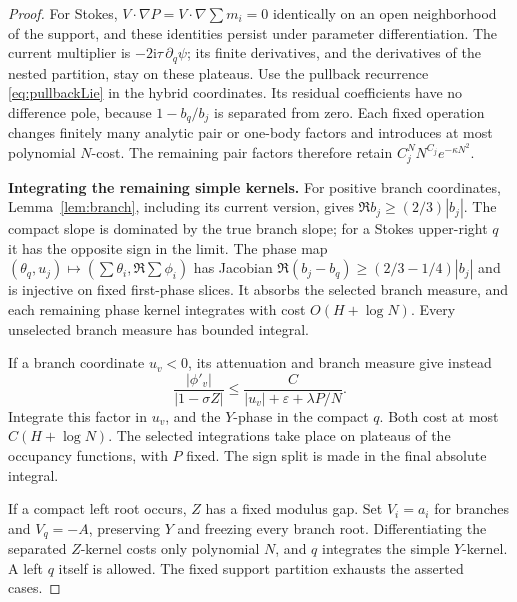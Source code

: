 \documentclass[11pt]{article}
\numberwithin{equation}{section}
\theoremstyle{definition}
\newcommand{\ii}{\mathrm i}
\newcommand{\eps}{\varepsilon}
\begin{document}
\begin{proof}
For Stokes, \(V\cdot\nabla P=V\cdot\nabla\sum m_i=0\) identically
on an open neighborhood of the support, and these identities persist
under parameter differentiation. The current multiplier is
\(-2\ii\tau\,\partial_q\psi\); its finite derivatives, and the
derivatives of the nested partition, stay on these plateaus.
Use the pullback recurrence \eqref{eq:pullbackLie} in the hybrid
coordinates. Its residual coefficients have no difference pole,
because \(1-b_q/b_j\) is separated from zero. Each fixed operation
changes finitely many analytic pair or one-body factors and
introduces at most polynomial \(N\)-cost. The remaining pair
factors therefore retain
\(C_j^N N^{C_j}e^{-\kappa N^2}\).

\par\smallskip\noindent\textbf{Integrating the remaining simple kernels.} For positive branch coordinates, Lemma~\ref{lem:branch}, including
its current version, gives \(\Re b_j\ge(2/3)|b_j|\).
The compact slope is dominated by the true branch slope; for a
Stokes upper-right \(q\) it has the opposite sign in the limit.
The phase map
\((\theta_q,u_j)\mapsto(\sum\theta_i,\Re\sum\phi_i)\)
has Jacobian \(\Re(b_j-b_q)\ge(2/3-1/4)|b_j|\)
and is injective on fixed first-phase slices.
It absorbs the selected branch measure, and each remaining phase
kernel integrates with cost \(O(H+\log N)\).
Every unselected branch measure has bounded integral.

If a branch coordinate \(u_v<0\), its attenuation and branch measure
give instead
\[
 \frac{|\phi'_v|}{|1-\sigma Z|}
 \le\frac C{|u_v|+\eps+\lambda P/N}.
\]
Integrate this factor in \(u_v\), and the \(Y\)-phase in the compact
\(q\). Both cost at most \(C(H+\log N)\).
The selected integrations take place on plateaus of the occupancy
functions, with \(P\) fixed. The sign split is made in the final
absolute integral.

If a compact left root occurs, \(Z\) has a fixed modulus gap.
Set \(V_i=a_i\) for branches and \(V_q=-A\), preserving \(Y\)
and freezing every branch root. Differentiating the separated
\(Z\)-kernel costs only polynomial \(N\), and \(q\) integrates
the simple \(Y\)-kernel. A left \(q\) itself is allowed.
The fixed support partition exhausts the asserted cases.
\end{proof}
\end{document}
